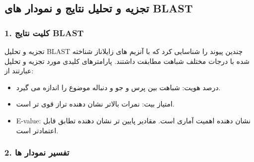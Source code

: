     \subsection{تجزیه و تحلیل نتایج و نمودار های BLAST}
        \subsubsection{1. کلیت نتایج BLAST}
        تجزیه و تحلیل BLAST چندین پیوند را شناسایی کرد که با آنزیم های زایلاناز شناخته شده با درجات مختلف شباهت مطابقت داشتند. پارامترهای کلیدی مورد تجزیه و تحلیل عبارتند از:
        \begin{itemize}
            \item درصد هویت: شباهت بین پرس و جو و دنباله موضوع را اندازه می گیرد.
            \item امتیاز بیت: نمرات بالاتر نشان دهنده تراز قوی تر است.
            \item E-value: نشان دهنده اهمیت آماری است. مقادیر پایین تر نشان دهنده تطابق قابل اعتمادتر است.
        \end{itemize}
        \subsubsection{2. تفسیر نمودار ها}
        
